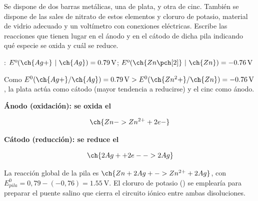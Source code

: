 \begin{exerciseEVAU}
    Se dispone de dos barras metálicas, una de plata, y otra de cinc. También se dispone de las sales de nitrato de estos elementos y cloruro de potasio, material de vidrio adecuado y un voltímetro con conexiones eléctricas. Escribe las reacciones que tienen lugar en el ánodo y en el cátodo de dicha pila indicando qué especie se oxida y cuál se reduce.

    \datos{}: \( E\text{º}(\ch{Ag+}\ | \ \ch{Ag}) = \SI{0.79}{\volt} \); \( E\text{º}(\ch{Zn\pch[2]}\ | \ \ch{Zn}) = \SI{-0.76}{\volt} \)

    \begin{solu}


        Como \(E^0(\ch{Ag+}/\ch{Ag}) = \SI{0.79}{\volt} > E^0(\ch{Zn^2+}/\ch{Zn}) = \SI{-0.76}{\volt}\), la plata actúa como cátodo (mayor tendencia a reducirse) y el cinc como ánodo.

        \textbf{Ánodo (oxidación): se oxida el }

        \begin{equation*}
            \ch{Zn -> Zn^{2+} + 2 e-}
        \end{equation*}

        \textbf{Cátodo (reducción): se reduce el }

        \begin{equation*}
            \ch{2 Ag+ + 2 e- -> 2 Ag}
        \end{equation*}

        La reacción global de la pila es \(\ch{Zn + 2 Ag+ -> Zn^{2+} + 2 Ag}\), con \(E^0_{pila} = 0,79-(-0,76) = \SI{1.55}{\volt}\). El cloruro de potasio () se emplearía para preparar el puente salino que cierra el circuito iónico entre ambas disoluciones.

    \end{solu}
\end{exerciseEVAU}


